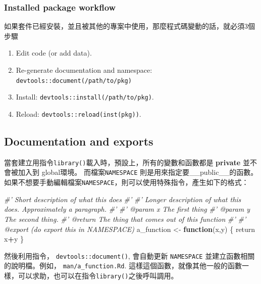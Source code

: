 \documentclass[]{book}
\newenvironment{Shaded}{\begin{snugshade}}{\end{snugshade}}
\newcommand{\CommentTok}[1]{\textcolor[rgb]{0.56,0.35,0.01}{\textit{#1}}}
\newcommand{\ControlFlowTok}[1]{\textcolor[rgb]{0.13,0.29,0.53}{\textbf{#1}}}
\newcommand{\NormalTok}[1]{#1}
\newcommand{\OperatorTok}[1]{\textcolor[rgb]{0.81,0.36,0.00}{\textbf{#1}}}
\newcommand{\StringTok}[1]{\textcolor[rgb]{0.31,0.60,0.02}{#1}}
\providecommand{\tightlist}{%
  \setlength{\itemsep}{0pt}\setlength{\parskip}{0pt}}
\theoremstyle{definition}
\theoremstyle{definition}
\theoremstyle{definition}
\theoremstyle{remark}
\begin{document}
\hypertarget{installed-package-workflow}{%
\subsubsection{Installed package
workflow}\label{installed-package-workflow}}

如果套件已經安裝，並且被其他的專案中使用，那麼程式碼變動的話，就必須3個步驟

\begin{enumerate}
\def\labelenumi{\arabic{enumi}.}
\tightlist
\item
  Edit code (or add data).
\item
  Re-generate documentation and namespace:
  \texttt{devtools::document(\textquotesingle{}/path/to/pkg\textquotesingle{})}
\item
  Install:
  \texttt{devtools::install(\textquotesingle{}/path/to/pkg\textquotesingle{})}.
\item
  Reload:
  \texttt{devtools::reload(inst(\textquotesingle{}pkg\textquotesingle{}))}.
\end{enumerate}

\hypertarget{documentation-and-exports}{%
\subsection{Documentation and exports}\label{documentation-and-exports}}

當套建立用指令\texttt{library()}載入時，預設上，所有的變數和函數都是
\textbf{private} 並不會被加入到 global環境。 而檔案\texttt{NAMESPACE}
則是用來指定要\_\_public\_\_的函數。
如果不想要手動編輯檔案\texttt{NAMESPACE}，則可以使用特殊指令，產生如下的格式：

\begin{Shaded}
\begin{Highlighting}[]
\CommentTok{#' Short description of what this does}
\CommentTok{#'}
\CommentTok{#' Longer description of what this does. Approximately a paragraph.}
\CommentTok{#'}
\CommentTok{#' @param x The first thing}
\CommentTok{#' @param y The second thing.}
\CommentTok{#' @return The thing that comes out of this function}
\CommentTok{#'}
\CommentTok{#' @export (do export this in NAMESPACE)}
\NormalTok{a_function <-}\StringTok{ }\ControlFlowTok{function}\NormalTok{(x,y) \{}
\NormalTok{  return x}\OperatorTok{+}\NormalTok{y}
\NormalTok{\}}
\end{Highlighting}
\end{Shaded}

然後利用指令， \texttt{devtools::document()}, 會自動更新
\texttt{NAMESPACE} 並建立函數相關的說明檔。例如，
\texttt{man/a\_function.Rd}.
這樣這個函數，就像其他一般的函數一樣，可以求助，也可以在指令\texttt{library()}之後呼叫調用。
\end{document}
